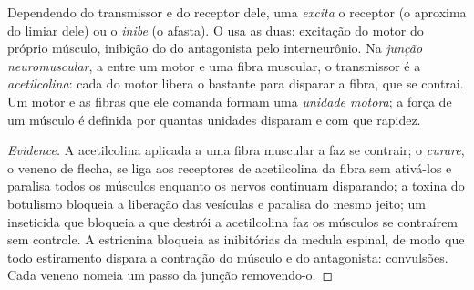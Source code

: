\begin{proposition}\label{prop:g12:stretch-reflex:junction}
Dependendo do transmissor e do receptor dele, uma 
\emph{excita} o  receptor (o aproxima do limiar dele) ou o
\emph{inibe} (o afasta). O  usa as duas: excitação
do  motor do próprio músculo, inibição do do antagonista pelo
interneurônio. Na \emph{junção neuromuscular}, a  entre um
 motor e uma fibra muscular, o transmissor é a
\emph{acetilcolina}: cada  do  motor libera o
bastante para disparar a fibra, que se contrai. Um  motor e as
fibras que ele comanda formam uma \emph{unidade motora}; a força de um
músculo é definida por quantas unidades disparam e com que rapidez.
\end{proposition}
\begin{proof}[Evidence]
A acetilcolina aplicada a uma fibra muscular a faz se contrair; o
\emph{curare}, o veneno de flecha, se liga aos receptores de
acetilcolina da fibra sem ativá-los e paralisa todos os músculos
enquanto os nervos continuam disparando; a toxina do botulismo bloqueia
a liberação das vesículas e paralisa do mesmo jeito; um inseticida que
bloqueia a  que destrói a acetilcolina faz os músculos se
contraírem sem controle. A estricnina bloqueia as  inibitórias
da medula espinal, de modo que todo estiramento dispara a contração do
músculo e do antagonista: convulsões. Cada veneno nomeia um passo da
junção removendo-o.
\end{proof}

